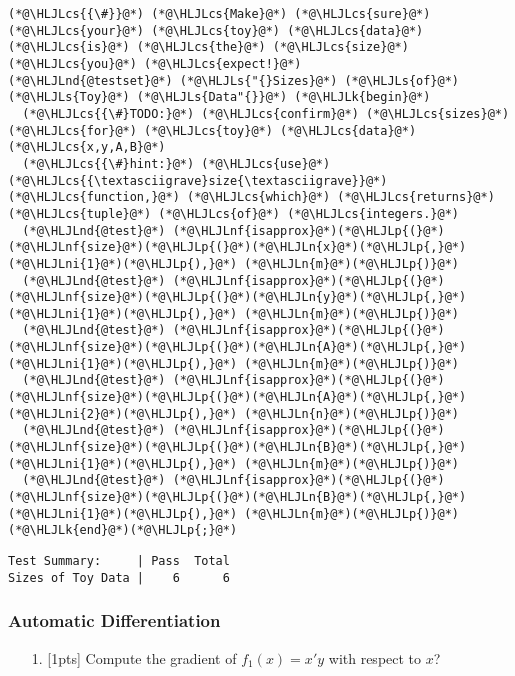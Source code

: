\documentclass[12pt,a4paper]{article}
\newcommand{\HLJLk}[1]{\textcolor[RGB]{148,91,176}{\textbf{#1}}}
\newcommand{\HLJLn}[1]{#1}
\newcommand{\HLJLnd}[1]{\textcolor[RGB]{214,102,97}{#1}}
\newcommand{\HLJLnf}[1]{\textcolor[RGB]{66,102,213}{#1}}
\newcommand{\HLJLs}[1]{\textcolor[RGB]{201,61,57}{#1}}
\newcommand{\HLJLni}[1]{\textcolor[RGB]{59,151,46}{#1}}
\newcommand{\HLJLp}[1]{#1}
\newcommand{\HLJLcs}[1]{\textcolor[RGB]{153,153,119}{\textit{#1}}}
\begin{document}
\begin{lstlisting}
(*@\HLJLcs{{\#}}@*) (*@\HLJLcs{Make}@*) (*@\HLJLcs{sure}@*) (*@\HLJLcs{your}@*) (*@\HLJLcs{toy}@*) (*@\HLJLcs{data}@*) (*@\HLJLcs{is}@*) (*@\HLJLcs{the}@*) (*@\HLJLcs{size}@*) (*@\HLJLcs{you}@*) (*@\HLJLcs{expect!}@*)
(*@\HLJLnd{@testset}@*) (*@\HLJLs{"{}Sizes}@*) (*@\HLJLs{of}@*) (*@\HLJLs{Toy}@*) (*@\HLJLs{Data"{}}@*) (*@\HLJLk{begin}@*)
  (*@\HLJLcs{{\#}TODO:}@*) (*@\HLJLcs{confirm}@*) (*@\HLJLcs{sizes}@*) (*@\HLJLcs{for}@*) (*@\HLJLcs{toy}@*) (*@\HLJLcs{data}@*) (*@\HLJLcs{x,y,A,B}@*)
  (*@\HLJLcs{{\#}hint:}@*) (*@\HLJLcs{use}@*) (*@\HLJLcs{{\textasciigrave}size{\textasciigrave}}@*) (*@\HLJLcs{function,}@*) (*@\HLJLcs{which}@*) (*@\HLJLcs{returns}@*) (*@\HLJLcs{tuple}@*) (*@\HLJLcs{of}@*) (*@\HLJLcs{integers.}@*)
  (*@\HLJLnd{@test}@*) (*@\HLJLnf{isapprox}@*)(*@\HLJLp{(}@*)(*@\HLJLnf{size}@*)(*@\HLJLp{(}@*)(*@\HLJLn{x}@*)(*@\HLJLp{,}@*) (*@\HLJLni{1}@*)(*@\HLJLp{),}@*) (*@\HLJLn{m}@*)(*@\HLJLp{)}@*)
  (*@\HLJLnd{@test}@*) (*@\HLJLnf{isapprox}@*)(*@\HLJLp{(}@*)(*@\HLJLnf{size}@*)(*@\HLJLp{(}@*)(*@\HLJLn{y}@*)(*@\HLJLp{,}@*) (*@\HLJLni{1}@*)(*@\HLJLp{),}@*) (*@\HLJLn{m}@*)(*@\HLJLp{)}@*)
  (*@\HLJLnd{@test}@*) (*@\HLJLnf{isapprox}@*)(*@\HLJLp{(}@*)(*@\HLJLnf{size}@*)(*@\HLJLp{(}@*)(*@\HLJLn{A}@*)(*@\HLJLp{,}@*) (*@\HLJLni{1}@*)(*@\HLJLp{),}@*) (*@\HLJLn{m}@*)(*@\HLJLp{)}@*)
  (*@\HLJLnd{@test}@*) (*@\HLJLnf{isapprox}@*)(*@\HLJLp{(}@*)(*@\HLJLnf{size}@*)(*@\HLJLp{(}@*)(*@\HLJLn{A}@*)(*@\HLJLp{,}@*) (*@\HLJLni{2}@*)(*@\HLJLp{),}@*) (*@\HLJLn{n}@*)(*@\HLJLp{)}@*)
  (*@\HLJLnd{@test}@*) (*@\HLJLnf{isapprox}@*)(*@\HLJLp{(}@*)(*@\HLJLnf{size}@*)(*@\HLJLp{(}@*)(*@\HLJLn{B}@*)(*@\HLJLp{,}@*) (*@\HLJLni{1}@*)(*@\HLJLp{),}@*) (*@\HLJLn{m}@*)(*@\HLJLp{)}@*)
  (*@\HLJLnd{@test}@*) (*@\HLJLnf{isapprox}@*)(*@\HLJLp{(}@*)(*@\HLJLnf{size}@*)(*@\HLJLp{(}@*)(*@\HLJLn{B}@*)(*@\HLJLp{,}@*) (*@\HLJLni{1}@*)(*@\HLJLp{),}@*) (*@\HLJLn{m}@*)(*@\HLJLp{)}@*)
(*@\HLJLk{end}@*)(*@\HLJLp{;}@*)
\end{lstlisting}

\begin{lstlisting}
Test Summary:     | Pass  Total
Sizes of Toy Data |    6      6
\end{lstlisting}


\subsubsection{Automatic Differentiation}
\begin{itemize}
\item[1. ] [1pts] Compute the gradient of $f_1(x) = x'y$ with respect to $x$?

\end{itemize}
\end{document}
